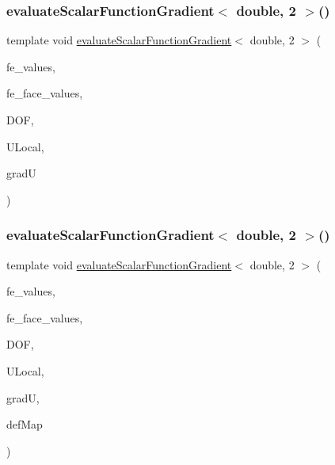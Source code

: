 \mbox{\label{function_evaluations_8cc_a6a96dc1c1ba16074a76b1d809a10a3c6}} 
\subsubsection{\texorpdfstring{evaluateScalarFunctionGradient$<$ double, 2 $>$()}{evaluateScalarFunctionGradient< double, 2 >()}\hspace{0.1cm}{\footnotesize\ttfamily [3/4]}}
{\footnotesize\ttfamily template void \mbox{\hyperlink{group___evaluation_functions_gabedd4ae2841d2332ed0df0513b189e34}{evaluate\+Scalar\+Function\+Gradient}}$<$ double, 2 $>$ (\begin{DoxyParamCaption}\item[{const F\+E\+Values$<$ 2 $>$ \&}]{fe\+\_\+values,  }\item[{const F\+E\+Face\+Values$<$ 2 $>$ \&}]{fe\+\_\+face\+\_\+values,  }\item[{unsigned int}]{D\+OF,  }\item[{Table$<$ 1, double $>$ \&}]{U\+Local,  }\item[{Table$<$ 2, double $>$ \&}]{gradU }\end{DoxyParamCaption})}

\mbox{\label{function_evaluations_8cc_ad5e8e4a735ad40906adb7a5107748ea9}} 
\subsubsection{\texorpdfstring{evaluateScalarFunctionGradient$<$ double, 2 $>$()}{evaluateScalarFunctionGradient< double, 2 >()}\hspace{0.1cm}{\footnotesize\ttfamily [4/4]}}
{\footnotesize\ttfamily template void \mbox{\hyperlink{group___evaluation_functions_gabedd4ae2841d2332ed0df0513b189e34}{evaluate\+Scalar\+Function\+Gradient}}$<$ double, 2 $>$ (\begin{DoxyParamCaption}\item[{const F\+E\+Values$<$ 2 $>$ \&}]{fe\+\_\+values,  }\item[{const F\+E\+Face\+Values$<$ 2 $>$ \&}]{fe\+\_\+face\+\_\+values,  }\item[{unsigned int}]{D\+OF,  }\item[{Table$<$ 1, double $>$ \&}]{U\+Local,  }\item[{Table$<$ 2, double $>$ \&}]{gradU,  }\item[{\mbox{\hyperlink{structdeformation_map}{deformation\+Map}}$<$ double, 2 $>$ \&}]{def\+Map }\end{DoxyParamCaption})}


